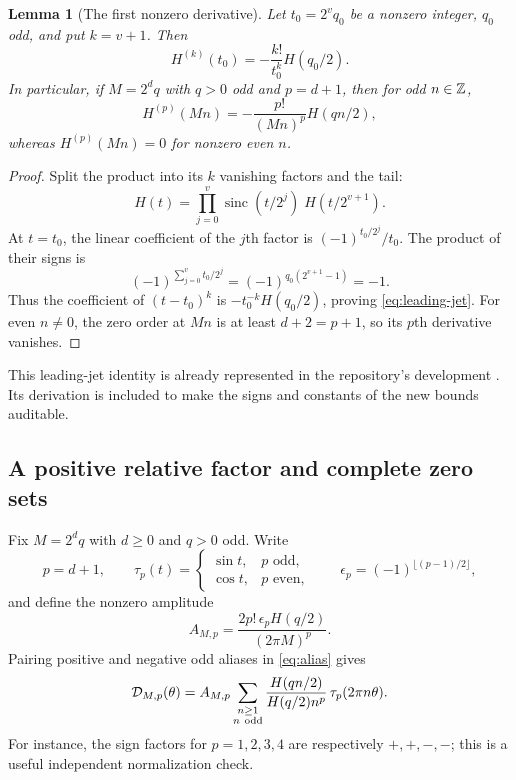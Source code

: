 \documentclass[11pt,a4paper]{article}
\numberwithin{equation}{section}
\newtheorem{lemma}[theorem]{Lemma}
\theoremstyle{definition}
\theoremstyle{remark}
\newcommand{\sinc}{\operatorname{sinc}}
\begin{document}
\begin{lemma}[The first nonzero derivative]
\label{lem:leading-jet}
Let $t_0=2^vq_0$ be a nonzero integer, $q_0$ odd, and put $k=v+1$.
Then
\begin{equation}
 H^{(k)}(t_0)=-\frac{k!}{t_0^k}H(q_0/2).
 \label{eq:leading-jet}
\end{equation}
In particular, if $M=2^dq$ with $q>0$ odd and $p=d+1$, then for
odd $n\in\mathbb Z$,
\begin{equation}
 H^{(p)}(Mn)=-\frac{p!}{(Mn)^p}H(qn/2),
 \label{eq:threshold-jet}
\end{equation}
whereas $H^{(p)}(Mn)=0$ for nonzero even $n$.
\end{lemma}
\begin{proof}
Split the product into its $k$ vanishing factors and the tail:
\[
 H(t)=\prod_{j=0}^{v}\sinc(t/2^j)\; H(t/2^{v+1}).
\]
At $t=t_0$, the linear coefficient of the $j$th factor is
$(-1)^{t_0/2^j}/t_0$. The product of their signs is
\[
 (-1)^{\sum_{j=0}^{v}t_0/2^j}
 =(-1)^{q_0(2^{v+1}-1)}=-1.
\]
Thus the coefficient of $(t-t_0)^k$ is
$-t_0^{-k}H(q_0/2)$, proving \eqref{eq:leading-jet}.
For even $n\ne0$, the zero order at $Mn$ is at least $d+2=p+1$,
so its $p$th derivative vanishes.
\end{proof}

This leading-jet identity is already represented in the repository's
 development \cite{repoComb}. Its derivation
is included to make the signs and constants of the new bounds auditable.

\subsection{A positive relative factor and complete zero sets}

Fix $M=2^dq$ with $d\ge0$ and $q>0$ odd. Write
\begin{equation}
 p=d+1,\qquad
 \tau_p(t)=\begin{cases}\sin t,&p\text{ odd},\\\cos t,&p\text{ even},\end{cases}
 \qquad \epsilon_p=(-1)^{\lfloor(p-1)/2\rfloor},
 \label{eq:tau}
\end{equation}
and define the nonzero amplitude
\begin{equation}
 A_{M,p}=\frac{2p!\,\epsilon_pH(q/2)}{(2\pi M)^p}.
 \label{eq:amplitude}
\end{equation}
Pairing positive and negative odd aliases in \eqref{eq:alias} gives
\begin{equation}
 \mathcal D_{M,p}(\theta)=A_{M,p}
 \sum_{\substack{n\ge1\\n\ \mathrm{odd}}}
 \frac{H(qn/2)}{H(q/2)n^p}\,\tau_p(2\pi n\theta).
 \label{eq:paired}
\end{equation}
For instance, the sign factors for $p=1,2,3,4$ are respectively
$+,+,-,-$; this is a useful independent normalization check.
\end{document}
